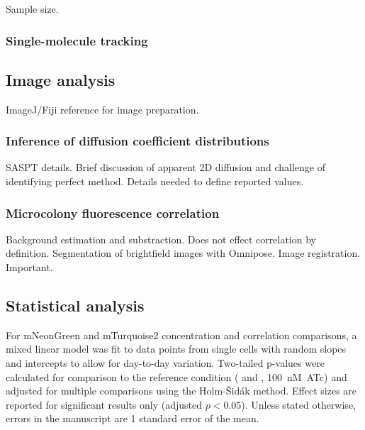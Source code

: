 \documentclass[pdflatex,sn-basic]{sn-jnl}%
\begin{document}
Sample size.

\loremipsum{} 

\subsubsection{Single-molecule tracking}

\loremipsum{} 

\subsection{Image analysis}

ImageJ/Fiji reference for image preparation.

\loremipsum{}

\subsubsection{Inference of diffusion coefficient distributions}

SASPT details.
Brief discussion of apparent 2D diffusion and challenge of identifying perfect method.
Details needed to define reported values.

\loremipsum{} 

\subsubsection{Microcolony fluorescence correlation}

Background estimation and substraction. Does not effect correlation by definition.
Segmentation of brightfield images with Omnipose.
Image registration. Important.

\loremipsum{} 

\subsection{Statistical analysis}

For mNeonGreen and mTurquoise2 concentration and correlation comparisons, a mixed linear model was fit to data points from single cells with random slopes and intercepts to allow for day-to-day variation. Two-tailed p-values were calculated for comparison to the reference condition (\permN{} and \ftsbdLQ{}, 100~nM~ATc) and adjusted for multiple comparisons using the Holm-Šidák method. Effect sizes are reported for significant results only (adjusted $p<0.05$). Unless stated otherwise, errors in the manuscript are 1 standard error of the mean.
\end{document}
